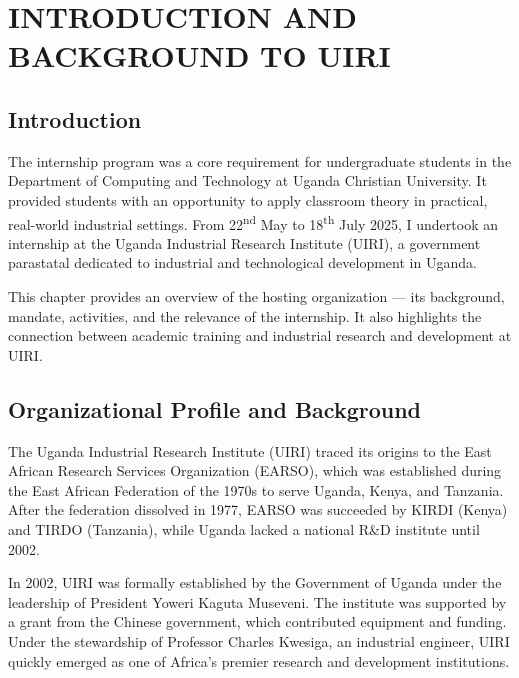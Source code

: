 \documentclass[12pt,a4paper]{report}
\begin{document}
\newpage
\tableofcontents
\vspace{40pt}

\listoffigures
\vspace{-10pt}
\newpage


\chapter{INTRODUCTION AND BACKGROUND TO UIRI}

\section{Introduction}
\noindent The internship program was a core requirement for undergraduate students in the Department of Computing and Technology at Uganda Christian University. It provided students with an opportunity to apply classroom theory in practical, real-world industrial settings. From 22\textsuperscript{nd} May to 18\textsuperscript{th} July 2025, I undertook an internship at the Uganda Industrial Research Institute (UIRI), a government parastatal dedicated to industrial and technological development in Uganda.

\noindent This chapter provides an overview of the hosting organization — its background, mandate, activities, and the relevance of the internship. It also highlights the connection between academic training and industrial research and development at UIRI.

\section{Organizational Profile and Background}
\noindent The Uganda Industrial Research Institute (UIRI) traced its origins to the East African Research Services Organization (EARSO), which was established during the East African Federation of the 1970s to serve Uganda, Kenya, and Tanzania. After the federation dissolved in 1977, EARSO was succeeded by KIRDI (Kenya) and TIRDO (Tanzania), while Uganda lacked a national R\&D institute until 2002.

\noindent In 2002, UIRI was formally established by the Government of Uganda under the leadership of President Yoweri Kaguta Museveni. The institute was supported by a grant from the Chinese government, which contributed equipment and funding. Under the stewardship of Professor Charles Kwesiga, an industrial engineer, UIRI quickly emerged as one of Africa's premier research and development institutions.
\end{document}
